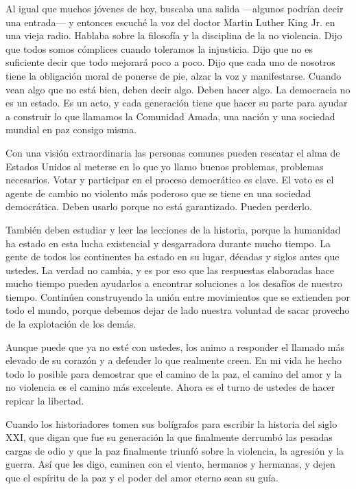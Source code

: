 Al igual que muchos jóvenes de hoy, buscaba una salida ---algunos
podrían decir una entrada--- y entonces escuché la voz del doctor Martin
Luther King Jr. en una vieja radio. Hablaba sobre la filosofía y la
disciplina de la no violencia. Dijo que todos somos cómplices cuando
toleramos la injusticia. Dijo que no es suficiente decir que todo
mejorará poco a poco. Dijo que cada uno de nosotros tiene la obligación
moral de ponerse de pie, alzar la voz y manifestarse. Cuando vean algo
que no está bien, deben decir algo. Deben hacer algo. La democracia no
es un estado. Es un acto, y cada generación tiene que hacer su parte
para ayudar a construir lo que llamamos la Comunidad Amada, una nación y
una sociedad mundial en paz consigo misma.

Con una visión extraordinaria las personas comunes pueden rescatar el
alma de Estados Unidos al meterse en lo que yo llamo buenos problemas,
problemas necesarios. Votar y participar en el proceso democrático es
clave. El voto es el agente de cambio no violento más poderoso que se
tiene en una sociedad democrática. Deben usarlo porque no está
garantizado. Pueden perderlo.

También deben estudiar y leer las lecciones de la historia, porque la
humanidad ha estado en esta lucha existencial y desgarradora durante
mucho tiempo. La gente de todos los continentes ha estado en su lugar,
décadas y siglos antes que ustedes. La verdad no cambia, y es por eso
que las respuestas elaboradas hace mucho tiempo pueden ayudarlos a
encontrar soluciones a los desafíos de nuestro tiempo. Continúen
construyendo la unión entre movimientos que se extienden por todo el
mundo, porque debemos dejar de lado nuestra voluntad de sacar provecho
de la explotación de los demás.

Aunque puede que ya no esté con ustedes, los animo a responder el
llamado más elevado de su corazón y a defender lo que realmente creen.
En mi vida he hecho todo lo posible para demostrar que el camino de la
paz, el camino del amor y la no violencia es el camino más excelente.
Ahora es el turno de ustedes de hacer repicar la libertad.

Cuando los historiadores tomen sus bolígrafos para escribir la historia
del siglo XXI, que digan que fue su generación la que finalmente
derrumbó las pesadas cargas de odio y que la paz finalmente triunfó
sobre la violencia, la agresión y la guerra. Así que les digo, caminen
con el viento, hermanos y hermanas, y dejen que el espíritu de la paz y
el poder del amor eterno sean su guía.


